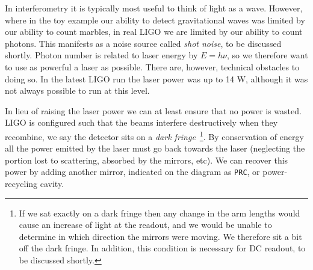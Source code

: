 In interferometry it is typically most useful to think of light as a
wave.  However, where in the toy example our ability to detect
gravitational waves was limited by our ability to count marbles, in
real LIGO we are limited by our ability to count photons.  This
manifests as a noise source called \emph{shot noise}, to be discussed
shortly.  Photon number is related to laser energy by $E=h\nu$, so we
therefore want to use as powerful a laser as possible.  There are,
however, technical obstacles to doing so.  In the latest LIGO run the
laser power was up to 14 W, although it was not always possible to run
at this level.

In lieu of raising the laser power we can at least ensure that no
power is wasted.  LIGO is configured such that the beams interfere
destructively when they recombine, we say the detector sits on a
\emph{dark fringe}~\footnote{If we sat exactly on a dark
fringe then any change in the arm lengths would cause an increase of
light at the readout, and we would be unable to determine in which
direction the mirrors were moving.  We therefore sit a bit off the
dark fringe.  In addition, this condition is necessary for DC readout,
to be discussed shortly.}.  By conservation of energy all the power
emitted by the laser must go back towards the laser (neglecting the
portion lost to scattering, absorbed by the mirrors, etc).  We can
recover this power by adding another mirror, indicated on the diagram
as \texttt{PRC}, or power-recycling cavity.


